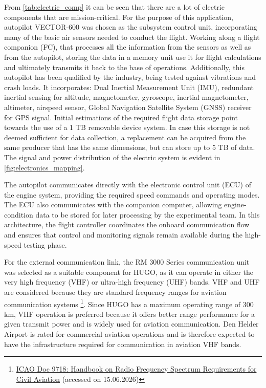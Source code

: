 From \autoref{tab:electric_comp} it can be seen that there are a lot of electric components that are mission-critical. For the purpose of this application, autopilot VECTOR-600 was chosen as the subsystem control unit, incorporating many of the basic air sensors needed to conduct the flight. Working along a flight companion (FC), that processes all the information from the sensors as well as from the autopilot, storing the data in a memory unit use it for flight calculations and ultimately transmits it back to the base of operations. Additionally, this autopilot has been qualified by the industry, being tested against vibrations and crash loads. It incorporates: Dual Inertial Measurement Unit (IMU), redundant inertial sensing for altitude, magnetometer, gyroscope, inertial magnetometer, altimeter, airspeed sensor, Global Navigation Satellite System (GNSS) receiver for GPS signal. Initial estimations of the required flight data storage point towards the use of a 1 TB removable device system. In case this storage is not deemed sufficient for data collection, a replacement can be acquired from the same producer that has the same dimensions, but can store up to 5 TB of data. The signal and power distribution of the electric system is evident in \autoref{fig:electronics_mapping}. 

The autopilot communicates directly with the electronic control unit (ECU) of the engine system, providing the required speed commands and operating modes. The ECU also communicates with the companion computer, allowing engine-condition data to be stored for later processing by the experimental team. In this architecture, the flight controller coordinates the onboard communication flow and ensures that control and monitoring signals remain available during the high-speed testing phase.

For the external communication link, the RM 3000 Series communication unit was selected as a suitable component for HUGO, as it can operate in either the very high frequency (VHF) or ultra-high frequency (UHF) bands. VHF and UHF are considered because they are standard frequency ranges for aviation communication systems \footnote{\href{https://www.icao.int/sites/default/files/FSMP/Doc.9718-Vol-I-AdvanceUneditedVersion-2021.pdf}{ICAO Doc 9718: Handbook on Radio Frequency Spectrum Requirements for Civil Aviation} (accessed on 15.06.2026)}. Since HUGO has a maximum operating range of 300 km, VHF operation is preferred because it offers better range performance for a given transmit power and is widely used for aviation communication. Den Helder Airport is rated for commercial aviation operations and is therefore expected to have the infrastructure required for communication in aviation VHF bands.

